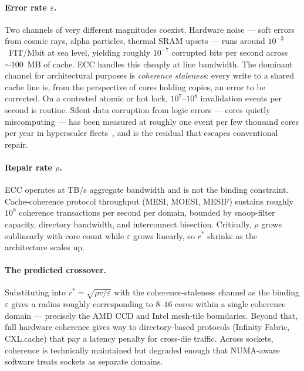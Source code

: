 \documentclass[11pt]{article}
\begin{document}
\paragraph{Error rate $\varepsilon$.} Two channels of very different magnitudes coexist. Hardware noise --- soft errors from cosmic rays, alpha particles, thermal SRAM upsets --- runs around $10^{-3}$~FIT/Mbit at sea level, yielding roughly $10^{-7}$ corrupted bits per second across $\sim 100$~MB of cache. ECC handles this cheaply at line bandwidth. The dominant channel for architectural purposes is \emph{coherence staleness}: every write to a shared cache line is, from the perspective of cores holding copies, an error to be corrected. On a contested atomic or hot lock, $10^{7}$--$10^{8}$ invalidation events per second is routine. Silent data corruption from logic errors --- cores quietly miscomputing --- has been measured at roughly one event per few thousand cores per year in hyperscaler fleets~\cite{google-sdc,meta-sdc}, and is the residual that escapes conventional repair.

\paragraph{Repair rate $\rho$.} ECC operates at TB/s aggregate bandwidth and is not the binding constraint. Cache-coherence protocol throughput (MESI, MOESI, MESIF) sustains roughly $10^{9}$ coherence transactions per second per domain, bounded by snoop-filter capacity, directory bandwidth, and interconnect bisection. Critically, $\rho$ grows sublinearly with core count while $\varepsilon$ grows linearly, so $r^{\ast}$ shrinks as the architecture scales up.

\paragraph{The predicted crossover.} Substituting into $r^{\ast} = \sqrt{\rho v / \varepsilon}$ with the coherence-staleness channel as the binding $\varepsilon$ gives a radius roughly corresponding to $8$--$16$ cores within a single coherence domain --- precisely the AMD CCD and Intel mesh-tile boundaries. Beyond that, full hardware coherence gives way to directory-based protocols (Infinity Fabric, CXL.cache) that pay a latency penalty for cross-die traffic. Across sockets, coherence is technically maintained but degraded enough that NUMA-aware software treats sockets as separate domains.
\end{document}
